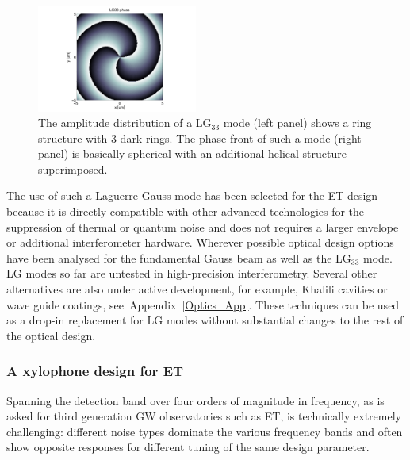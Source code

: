 {\begin{figure}[H]
      \includegraphics[width=0.47\textwidth, viewport=180 0 740 530]{Sec_Optics/LG33_phs}
\caption{The amplitude distribution of a LG$_{33}$ mode (left panel)
  shows a ring structure with 3 dark rings. The phase front of such a
  mode (right panel) is basically spherical with an additional helical
  structure superimposed.  
}\label{Fig:LG33}
\end{figure}
%
The use of such a Laguerre-Gauss mode has been
selected for the ET design because it is directly compatible with 
other advanced technologies for the suppression of thermal or
quantum noise and does not requires a larger envelope or additional
interferometer hardware. Wherever possible optical design 
options have been analysed for the fundamental Gauss beam as
well as the LG$_{33}$ mode.
%
LG modes so far are
untested in high-precision interferometry.
Several other alternatives are also under
active development, for example, Khalili cavities or wave guide
coatings, see~Appendix~\ref{Optics_App}.  These techniques can
be used as a drop-in replacement for LG modes without substantial
changes to the rest of the optical design.
}

\FloatBarrier
\subsubsection{A xylophone design for ET}\label{sec:xylophone}
\label{Xylophone}
Spanning the detection band over four orders of magnitude in frequency,
as is asked for third generation GW observatories such as ET,
is technically extremely challenging: different noise types dominate the various
frequency bands and often show opposite responses for different
tuning of the same design parameter.



